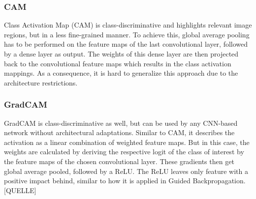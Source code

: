 \documentclass{article}
\begin{document}
\subsubsection{CAM}
Class Activation Map (CAM) is class-discriminative and highlights relevant image regions, but in a less fine-grained manner.
To achieve this, global average pooling has to be performed on the feature maps of the last convolutional layer, followed by a dense layer as output.
The weights of this dense layer are then projected back to the convolutional feature maps which results in the class activation mappings.
As a consequence, it is hard to generalize this approach due to the architecture restrictions.
\subsubsection{GradCAM}
GradCAM is class-discriminative as well, but can be used by any CNN-based network without architectural adaptations.
Similar to CAM, it describes the activation as a linear combination of weighted feature maps. But in this case, the weights are calculated
by deriving the respective logit of the class of interest by the feature maps of the chosen convolutional layer. These gradients then get global average pooled, followed by a ReLU.
The ReLU leaves only feature with a positive impact behind, similar to how it is applied in Guided Backpropagation.[QUELLE]
\end{document}
